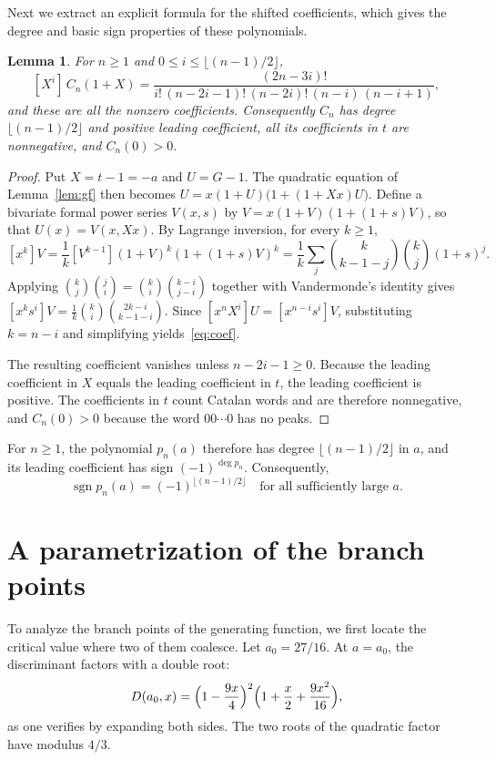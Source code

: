 \documentclass[11pt]{amsart}
\newtheorem{lemma}[theorem]{Lemma}
\theoremstyle{remark}
\newcommand{\sgn}{\operatorname{sgn}}
\begin{document}
Next we extract an explicit formula for the shifted coefficients, which
gives the degree and basic sign properties of these polynomials.

\begin{lemma}\label{lem:basic}
For $n\ge1$ and $0\le i\le\lfloor(n-1)/2\rfloor$,
\begin{equation}\label{eq:coef}
 [X^i]\,C_n(1+X)=\frac{(2n-3i)!}{i!\,(n-2i-1)!\,(n-2i)!\,(n-i)\,(n-i+1)},
\end{equation}
and these are all the nonzero coefficients. Consequently $C_n$ has degree
$\lfloor(n-1)/2\rfloor$ and positive leading coefficient, all its
coefficients in $t$ are nonnegative, and $C_n(0)>0$.
\end{lemma}

\begin{proof}
Put $X=t-1=-a$ and $U=G-1$. The quadratic equation of Lemma~\ref{lem:gf}
then becomes $U=x(1+U)\bigl(1+(1+Xx)U\bigr)$. Define a bivariate formal
power series $V(x,s)$ by $V=x(1+V)(1+(1+s)V)$, so that $U(x)=V(x,Xx)$. By
Lagrange inversion, for every $k\ge1$,
\[
 [x^k]V=\frac1k[V^{k-1}](1+V)^k(1+(1+s)V)^k
 =\frac1k\sum_{j}\binom{k}{k-1-j}\binom kj(1+s)^j .
\]
Applying $\binom kj\binom ji=\binom ki\binom{k-i}{j-i}$ together with
Vandermonde's identity gives
$[x^ks^i]V=\frac1k\binom ki\binom{2k-i}{k-1-i}$. Since
$[x^nX^i]U=[x^{n-i}s^i]V$, substituting $k=n-i$ and simplifying
yields~\eqref{eq:coef}.

The resulting coefficient vanishes unless $n-2i-1\ge0$. Because the leading
coefficient in $X$ equals the leading coefficient in $t$, the leading
coefficient is positive. The coefficients in $t$ count Catalan words and are
therefore nonnegative, and $C_n(0)>0$ because the word $00\cdots0$ has no
peaks.
\end{proof}

For $n\ge1$, the polynomial $p_n(a)$ therefore has degree
$\lfloor(n-1)/2\rfloor$ in $a$, and its leading coefficient has sign
$(-1)^{\deg p_n}$. Consequently,
\begin{equation}\label{eq:infty}
 \sgn p_n(a)=(-1)^{\lfloor(n-1)/2\rfloor}\quad\text{for all sufficiently large } a.
\end{equation}

\section{A parametrization of the branch points}\label{sec:param}

To analyze the branch points of the generating function, we first locate the
critical value where two of them coalesce. Let $a_0=27/16$. At $a=a_0$, the
discriminant factors with a double root:
\begin{equation}\label{eq:Dcrit}
 D(a_0,x)=\Bigl(1-\frac{9x}{4}\Bigr)^2\Bigl(1+\frac x2+\frac{9x^2}{16}\Bigr),
\end{equation}
as one verifies by expanding both sides. The two roots of the quadratic
factor have modulus $4/3$.
\end{document}
